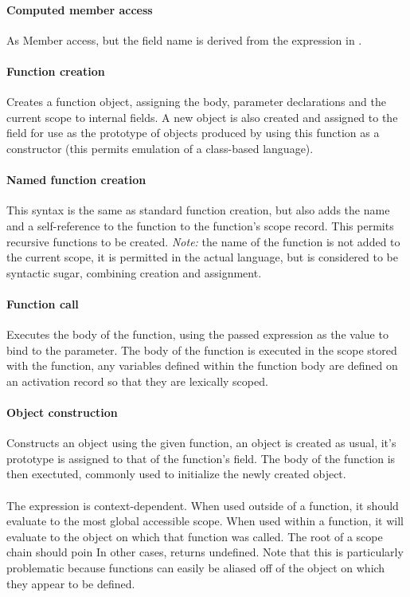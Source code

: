\documentclass[a4paper]{article}
\begin{document}
\paragraph{Computed member access} As Member access, but the field name is derived from
the expression in \js{[]}.

\paragraph{Function creation} Creates a function object, assigning the body, parameter
declarations and the current scope to internal fields. A new object is also
created and assigned to the  field for use as the prototype of
objects produced by using this function as a constructor (this permits
emulation of a class-based language).

\paragraph{Named function creation} This syntax is the same as standard function creation,
but also adds the name and a self-reference to the function to the function's
scope record. This permits recursive functions to be created. \emph{Note:} the
name of the function is not added to the current scope, it is permitted in the
actual language, but is considered to be syntactic sugar, combining creation and
assignment.

\paragraph{Function call} Executes the body of the function, using the passed expression
as the value to bind to the parameter. The body of the function is executed in
the scope stored with the function, any variables defined within the function
body are defined on an activation record so that they are lexically scoped.

\paragraph{Object construction} Constructs an object using the given function, an object
is created as usual, it's prototype is assigned to that of the function's
 field. The body of the function is then exectuted, commonly used
to initialize the newly created object.

\paragraph{} The  expression is context-dependent. When used outside of a
function, it should evaluate to the most global accessible scope.
When used within a function, it will evaluate to the object
on which that function was called. The root of a scope chain should poin In %
other cases,  returns undefined. Note that this is particularly
problematic because functions can easily be aliased off of the object on which
they appear to be defined.
\end{document}

